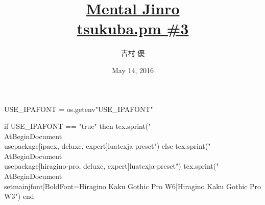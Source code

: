 \hypersetup{colorlinks,linkcolor=,urlcolor=links}

\beamertemplatenavigationsymbolsempty

\usepackage{luacode}
\usepackage{luatexja}
\usepackage{pgfpages}
\usepackage[osf]{mathpazo}
\usepackage{fontspec}

\begin{luacode*}
  USE_IPAFONT = os.getenv"USE_IPAFONT"
  
  if USE_IPAFONT == "true" then
    tex.sprint("\\AtBeginDocument{\\usepackage[ipaex, deluxe, expert]{luatexja-preset}}")
  else
    tex.sprint("\\AtBeginDocument{\\usepackage[hiragino-pro, deluxe, expert]{luatexja-preset}}")
    tex.sprint("\\AtBeginDocument{\\setmainjfont[BoldFont=Hiragino Kaku Gothic Pro W6]{Hiragino Kaku Gothic Pro W3}}")
  end
\end{luacode*}

\usepackage{epigraph}
\usepackage{etoolbox}
\usepackage{tikz}
\usepackage{framed}
\usepackage{libertine}
\usepackage[final]{listings}
\usepackage{amsmath}
\usepackage{mathtools}



\setmainfont[Numbers=OldStyle, BoldFont=Palatino Bold]{Palatino}
\setsansfont{CMU Sans Serif}
\setmonofont{CMU Typewriter Text}

\title[Mental Jinro]{%
  \href{https://github.com/y-yu/mental-jinro-slide}{Mental Jinro} \\
  \href{http://connpass.com/event/30661/}{\normalsize tsukuba.pm \#3}
}
\author{吉村 優}
\date{May 14, 2016}






\newcommand\ballref[1]{%
\tikz \node[circle, shade,ball color=structure.fg,inner sep=0pt,%
  text width=8pt,font=\tiny,align=center] {\color{white}\ref{#1}};
}

